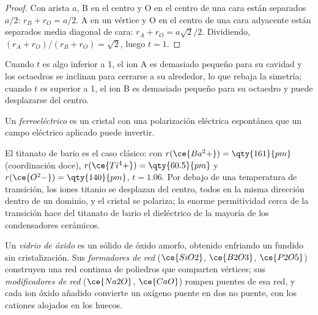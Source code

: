 \begin{proof}
Con arista $a$, B en el centro y O en el centro de una cara están separados $a/2$: $r_B + r_O = a/2$.
A en un vértice y O en el centro de una cara adyacente están separados media diagonal
de cara: $r_A + r_O = a\sqrt2/2$. Dividiendo, $(r_A + r_O)/(r_B + r_O) = \sqrt2$, luego $t = 1$.
\end{proof}

Cuando $t$ es algo inferior a 1, el ion A es demasiado pequeño para su cavidad y los
octaedros se inclinan para cerrarse a su alrededor, lo que rebaja la simetría; cuando $t$ es superior a 1,
el ion B es demasiado pequeño para su octaedro y puede desplazarse del centro.

\begin{definition}[Ferroeléctrico]\label{def:b3:inorganic-materials:ferroelectric}
Un \emph{ferroeléctrico} es un cristal con una polarización
eléctrica espontánea que un campo eléctrico aplicado puede invertir.
\end{definition}

El titanato de bario es el caso clásico: con $r(\ce{Ba^2+}) = \qty{161}{pm}$ (coordinación doce),
$r(\ce{Ti^4+}) = \qty{60.5}{pm}$ y $r(\ce{O^2-}) = \qty{140}{pm}$, $t = 1.06$. Por debajo de una temperatura de transición, los
iones titanio se desplazan del centro, todos en la misma dirección dentro de un dominio,
y el cristal se polariza; la enorme permitividad cerca de la transición hace del
titanato de bario el dieléctrico de la mayoría de los condensadores cerámicos.

\begin{definition}\label{def:b3:inorganic-materials:glass}
Un \emph{vidrio de óxido} es un sólido de óxido amorfo, obtenido
enfriando un fundido sin cristalización. Sus \emph{formadores de
red} ($\ce{SiO2}$, $\ce{B2O3}$, $\ce{P2O5}$) construyen una red continua de
poliedros que comparten vértices; sus \emph{modificadores de red}
($\ce{Na2O}$, $\ce{CaO}$) rompen puentes de esa red, y cada ion óxido añadido convierte un
oxígeno puente en dos no puente, con los cationes alojados en los
huecos.
\end{definition}

